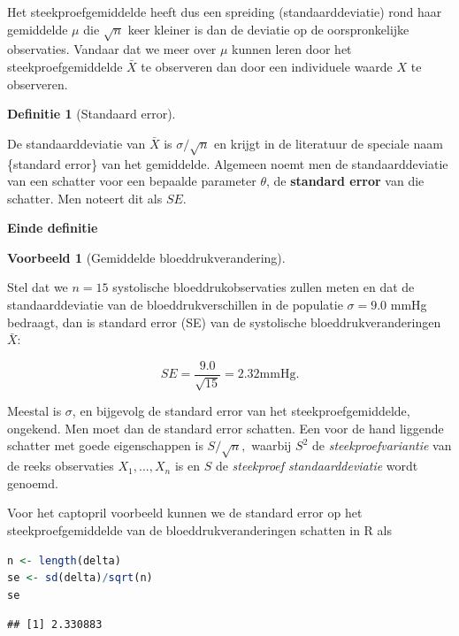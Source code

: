 \documentclass[
  12pt,dutch,coursenotes]{book}
\theoremstyle{definition}
\newtheorem{definition}{Definitie}[chapter]
\theoremstyle{definition}
\newtheorem{example}{Voorbeeld}[chapter]
\theoremstyle{definition}
\theoremstyle{definition}
\theoremstyle{remark}
\begin{document}
Het steekproefgemiddelde heeft dus een spreiding (standaarddeviatie) rond
haar gemiddelde \(\mu\) die \(\sqrt{n}\) keer kleiner is dan de deviatie op de
oorspronkelijke observaties. Vandaar dat we meer over \(\mu\) kunnen leren
door het steekproefgemiddelde \(\bar X\) te observeren dan door een
individuele waarde \(X\) te observeren.

\begin{definition}[Standaard error]
\protect\hypertarget{def:unnamed-chunk-130}{}{\label{def:unnamed-chunk-130} {} }
\end{definition}
De standaarddeviatie van \(\bar{X}\) is \(\sigma/\sqrt{n}\) en krijgt in de literatuur de speciale naam \{standard error\} van
het gemiddelde. Algemeen noemt men de standaarddeviatie van een schatter
voor een bepaalde parameter \(\theta\), de \textbf{standard error} van die
schatter. Men noteert dit als \(SE\).

\textbf{Einde definitie}

\begin{example}[Gemiddelde bloeddrukverandering]
\protect\hypertarget{exm:unnamed-chunk-131}{}{\label{exm:unnamed-chunk-131} {} }
\end{example}
Stel dat we \(n = 15\) systolische bloeddrukobservaties zullen meten en dat de standaarddeviatie van de bloeddrukverschillen in de populatie \(\sigma = 9.0\) mmHg bedraagt, dan is standard error (SE) van de systolische bloeddrukveranderingen \(\bar X\):

\[
SE= \frac{9.0}{\sqrt{15}}=2.32\text{mmHg.}
\]

Meestal is \(\sigma\), en bijgevolg de standard error van het
steekproefgemiddelde, ongekend. Men moet dan de standard error schatten.
Een voor de hand liggende schatter met goede eigenschappen is \(S/\sqrt{n},\)
waarbij \(S^2\) de \emph{steekproefvariantie} van de reeks observaties \(X_1,...,X_n\) is en \(S\) de \emph{steekproef standaarddeviatie} wordt genoemd.

Voor het captopril voorbeeld kunnen we de standard error op het steekproefgemiddelde van de bloeddrukveranderingen schatten in R als

\begin{lstlisting}[language=R]
n <- length(delta)
se <- sd(delta)/sqrt(n)
se
\end{lstlisting}

\begin{lstlisting}
## [1] 2.330883
\end{lstlisting}
\end{document}
